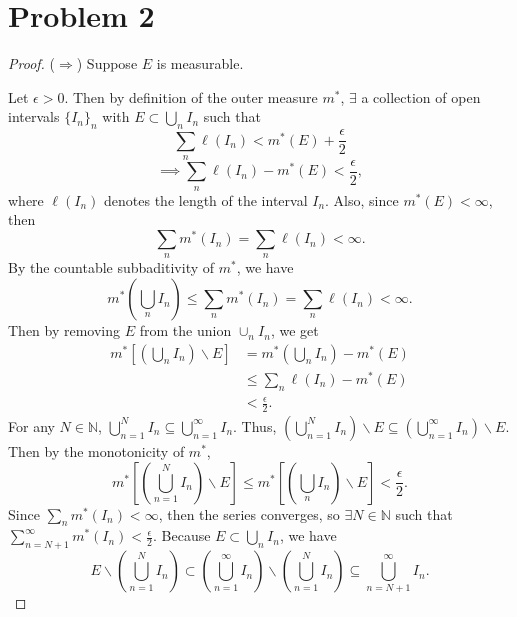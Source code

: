 \documentclass{article}
\begin{document}
\section*{Problem 2}
\begin{proof}
	($\Rightarrow$) Suppose $E$ is measurable. 
	
	Let $\epsilon > 0$. Then by definition of the outer measure $m^*$, $\exists$ a collection of open intervals $\{I_n\}_n$ with $E\subset \bigcup_n I_n$ such that
	\begin{equation}
		\sum_n \ell(I_n) < m^*(E) + \frac{\epsilon}{2}
	\end{equation}
	\begin{equation}
		\implies \sum_n \ell (I_n) - m^*(E) < \frac{\epsilon}{2},
	\end{equation}
	where $\ell (I_n)$ denotes the length of the interval $I_n$. Also, since $m^*(E) < \infty$, then
	\begin{equation}
		\sum_n m^*(I_n) = \sum_n \ell (I_n) < \infty.
	\end{equation}
	By the countable subbaditivity of $m^*$, we have
	\begin{equation}
		m^*\left(\bigcup_n I_n\right) \leq \sum_n m^*(I_n) = \sum_n \ell (I_n) < \infty.
	\end{equation}
	Then by removing $E$ from the union $\cup_n I_n$, we get
	\begin{align}
		m^*\left[\left(\bigcup_n I_n\right) \backslash E\right] &= m^*\left(\bigcup_n I_n \right) - m^*(E) \\
		&\leq \sum_n \ell (I_n) - m^*(E) \\
		&< \frac{\epsilon}{2}.
	\end{align}
	For any $N \in \mathbb{N}$, $\bigcup_{n=1}^N I_n \subseteq \bigcup_{n=1}^{\infty}I_n$. Thus, $\left(\bigcup_{n=1}^N I_n\right) \backslash E \subseteq \left(\bigcup_{n=1}^{\infty}I_n\right) \backslash E$. Then by the monotonicity of $m^*$,
	\begin{equation}\label{star}
		m^*\left[\left(\bigcup_{n=1}^N I_n\right) \backslash E\right] \leq m^*\left[\left(\bigcup_n I_n\right) \backslash E\right] < \frac{\epsilon}{2}.
	\end{equation}
	Since $\sum_n m^*(I_n) < \infty$, then the series converges, so $\exists N \in \mathbb{N}$ such that \\$\sum_{n=N+1}^{\infty}m^*(I_n) < \frac{\epsilon}{2}$. Because $E \subset \bigcup_n I_n$, we have
	\begin{equation}
		E \backslash \left(\bigcup_{n=1}^N I_n\right) \subset \left(\bigcup_{n=1}^{\infty}I_n\right) \backslash \left(\bigcup_{n=1}^N I_n\right) \subseteq \bigcup_{n=N+1}^{\infty}I_n.

\end{equation}
\end{proof}
\end{document}
